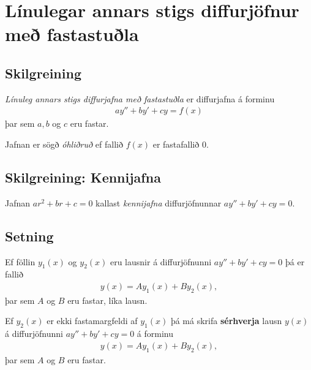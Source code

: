\documentclass[a4paper,10pt,icelandic]{sphinxmanual}
\begin{document}
\section{Línulegar annars stigs diffurjöfnur með fastastuðla}
\label{kafli08:linulegar-annars-stigs-diffurjofnur-me-fastastula}

\subsection{Skilgreining}
\label{kafli08:skilgreining}
\emph{Línuleg annars stigs diffurjafna með fastastuðla} er diffurjafna á
forminu
\begin{equation*}
\begin{split}ay''+by'+cy=f(x)\end{split}
\end{equation*}
þar sem \(a, b\) og \(c\) eru fastar.

Jafnan er sögð \emph{óhliðruð} ef fallið \(f(x)\) er
fastafallið 0.


\subsection{Skilgreining: Kennijafna}
\label{kafli08:skilgreining-kennijafna}\label{kafli08:index-6}
Jafnan \(ar^2+br+c=0\) kallast \textit{kennijafna}
diffurjöfnunnar \(ay''+by'+cy=0\).


\subsection{Setning}
\label{kafli08:setning}
Ef föllin \(y_1(x)\) og \(y_2(x)\) eru lausnir á diffurjöfnunni
\(ay''+by'+cy=0\) þá er fallið
\begin{equation*}
\begin{split}y(x)=Ay_1(x)+By_2(x),\end{split}
\end{equation*}
þar sem \(A\) og \(B\) eru fastar, líka lausn.

Ef \(y_2(x)\) er ekki fastamargfeldi af \(y_1(x)\) þá má skrifa
\textbf{sérhverja} lausn \(y(x)\) á diffurjöfnunni \(ay''+by'+cy=0\)
á forminu
\begin{equation*}
\begin{split}y(x)=Ay_1(x)+By_2(x),\end{split}
\end{equation*}
þar sem \(A\) og \(B\) eru fastar.
\end{document}

